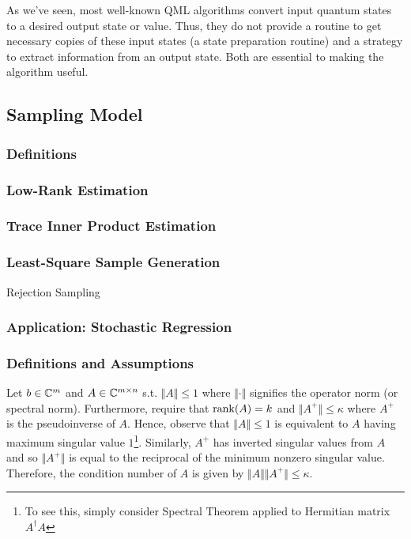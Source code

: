 \documentclass[main.tex]{subfiles}
\begin{document}
As we've seen, most well-known QML algorithms convert input quantum states to a desired output state or value. Thus, they do not provide a routine to get necessary copies of these input states (a state preparation routine) and a strategy to extract information from an output state. Both are essential to making the algorithm useful.

\subsection{Sampling Model}

\subsubsection{Definitions}

\subsubsection{Low-Rank Estimation}

\subsubsection{Trace Inner Product Estimation}

\subsubsection{Least-Square Sample Generation}

Rejection Sampling

\subsubsection{Application: Stochastic Regression}

\subsubsection{Definitions and Assumptions}

Let $b \in \mathbb{C}^m$ and $A \in \mathbb{C}^{m \times n}$ s.t. $\Vert A \Vert \leq 1$ where $\Vert \cdot \Vert$ signifies the operator norm (or spectral norm). Furthermore, require that $\rank(A) = k$ and $\Vert A^+ \Vert \leq \kappa$ where $A^+$ is the pseudoinverse of $A$. Hence, observe that $\Vert A \Vert \leq 1$ is equivalent to $A$ having maximum singular value $1$\footnote{To see this, simply consider Spectral Theorem applied to Hermitian matrix $A^\dag A$}. Similarly, $A^+$ has inverted singular values from $A$ and so $\Vert A^+ \Vert$ is equal to the reciprocal of the minimum nonzero singular value. Therefore, the condition number of $A$ is given by $\Vert A \Vert \Vert A^+ \Vert \leq \kappa$.
\end{document}
